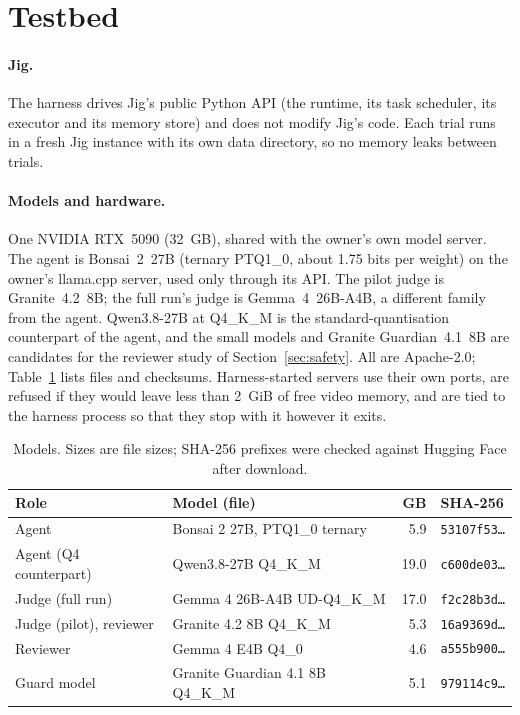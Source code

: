 \section{Testbed}
\label{sec:testbed}

\paragraph{Jig.} The harness drives Jig's public Python API (the runtime, its task scheduler, its
executor and its memory store) and does not modify Jig's code. Each trial runs in a fresh Jig instance
with its own data directory, so no memory leaks between trials.

\paragraph{Models and hardware.} One NVIDIA RTX~5090 (32~GB), shared with the owner's own model server.
The agent is Bonsai~2~27B (ternary PTQ1\_0, about 1.75 bits per weight) on the owner's llama.cpp server,
used only through its API. The pilot judge is Granite~4.2~8B; the full run's judge is Gemma~4~26B-A4B, a
different family from the agent. Qwen3.8-27B at Q4\_K\_M is the standard-quantisation counterpart of the
agent, and the small models and Granite Guardian~4.1~8B are candidates for the reviewer study of
Section~\ref{sec:safety}. All are Apache-2.0; Table~\ref{tab:models} lists files and checksums.
Harness-started servers use their own ports, are refused if they would leave less than 2~GiB of free
video memory, and are tied to the harness process so that they stop with it however it exits.

\begin{table}[t]\centering\small
\caption{Models. Sizes are file sizes; SHA-256 prefixes were checked against Hugging Face after download.}
\label{tab:models}
\begin{tabular}{llrl}\toprule
Role & Model (file) & GB & SHA-256 \\\midrule
Agent & Bonsai 2 27B, PTQ1\_0 ternary & 5.9 & \texttt{53107f53\ldots} \\
Agent (Q4 counterpart) & Qwen3.8-27B Q4\_K\_M & 19.0 & \texttt{c600de03\ldots} \\
Judge (full run) & Gemma 4 26B-A4B UD-Q4\_K\_M & 17.0 & \texttt{f2c28b3d\ldots} \\
Judge (pilot), reviewer & Granite 4.2 8B Q4\_K\_M & 5.3 & \texttt{16a9369d\ldots} \\
Reviewer & Gemma 4 E4B Q4\_0 & 4.6 & \texttt{a555b900\ldots} \\
Guard model & Granite Guardian 4.1 8B Q4\_K\_M & 5.1 & \texttt{979114c9\ldots} \\
\bottomrule\end{tabular}
\end{table}
